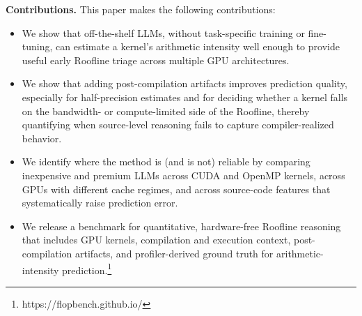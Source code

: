 \textbf{Contributions.}
This paper makes the following contributions:
\begin{itemize}

    \item We show that off-the-shelf LLMs, without task-specific training or fine-tuning, can estimate a kernel's arithmetic intensity well enough to provide useful early Roofline triage across multiple GPU architectures.
    \item We show that adding post-compilation artifacts improves prediction quality, especially for half-precision estimates and for deciding whether a kernel falls on the bandwidth- or compute-limited side of the Roofline, thereby quantifying when source-level reasoning fails to capture compiler-realized behavior.
    \item We identify where the method is (and is not) reliable by comparing inexpensive and premium LLMs across CUDA and OpenMP kernels, across GPUs with different cache regimes, and across source-code features that systematically raise prediction error.
    \item We release a benchmark for quantitative, hardware-free Roofline reasoning that includes GPU kernels, compilation and execution context, post-compilation artifacts, and profiler-derived ground truth for arithmetic-intensity prediction.\footnote{https://flopbench.github.io/}


\end{itemize}
